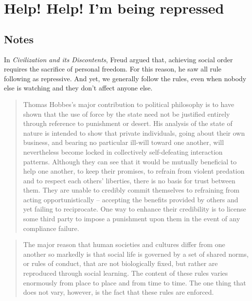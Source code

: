 \chapter{Help! Help! I'm being repressed}


\section{Notes}
In \textit{Civilization and its Discontents}, Freud argued that, achieving social order requires the sacrifice of personal freedom. For this reason, he saw all rule following as repressive. And yet, we generally follow the rules, even when nobody else is watching and they don't affect anyone else. 

\begin{quote}
    Thomas Hobbes's major contribution to political philosophy is to have shown that the use of force by the state need not be justified entirely through reference to punishment or desert. His analysis of the state of nature is intended to show that private individuals, going about their own business, and bearing no particular ill-will toward one another, will nevertheless become locked in collectively self-defeating interaction patterns. Although they can see that it would be mutually beneficial to help one another, to keep their promises, to refrain from violent predation and to respect each others' liberties, there is no basis for trust between them. They are unable to credibly commit themselves to refraining from acting opportunistically -- accepting the benefits provided by others and yet failing to reciprocate. One way to enhance their credibility is to license some third party to impose a punishment upon them in the event of any compliance failure. \\\citep[891]{Heath2023}
\end{quote}

\begin{quote}
    The major reason that human societies and cultures differ from one another so markedly is that social life is governed by a set of shared norms, or rules of conduct, that are not biologically fixed, but rather are reproduced through social learning. The content of these rules varies enormously from place to place and from time to time. The one thing that does not vary, however, is the fact that these rules are enforced. \\\citep[897]{Heath2023}
\end{quote}

